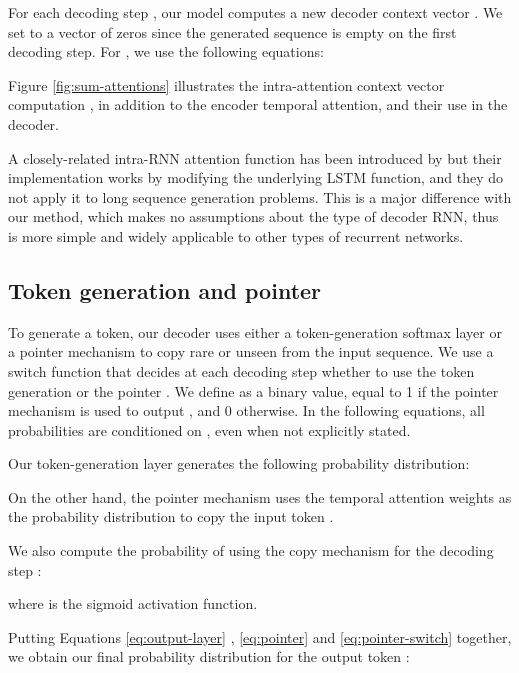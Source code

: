 \documentclass{article} \usepackage{iclr2018_arxiv,times}
\begin{document}
For each decoding step , our model computes a new decoder context vector . We set  to a vector of zeros since the generated sequence is empty on the first decoding step. For , we use the following equations:
\vspace{-5mm}
\begin{multicols}{3}
\end{multicols}

Figure \ref{fig:sum-attentions} illustrates the intra-attention context vector computation , in addition to the encoder temporal attention, and their use in the decoder.

A closely-related intra-RNN attention function has been introduced by \citet{cheng2016} but their implementation works by modifying the underlying LSTM function, and they do not apply it to long sequence generation problems. This is a major difference with our method, which makes no assumptions about the type of decoder RNN, thus is more simple and widely applicable to other types of recurrent networks.

\subsection{Token generation and pointer}
\label{ssec:output-layer}

To generate a token, our decoder uses either a token-generation softmax layer or a pointer mechanism to copy rare or unseen from the input sequence. We use a switch function that decides at each decoding step whether to use the token generation or the pointer \citep{gulcehre2016,nallapati2016}. We define  as a binary value, equal to 1 if the pointer mechanism is used to output , and 0 otherwise. In the following equations, all probabilities are conditioned on , even when not explicitly stated.


Our token-generation layer generates the following probability distribution:


On the other hand, the pointer mechanism uses the temporal attention weights  as the probability distribution to copy the input token .


We also compute the probability of using the copy mechanism for the decoding step :


where  is the sigmoid activation function.

Putting Equations \ref{eq:output-layer} , \ref{eq:pointer} and \ref{eq:pointer-switch} together, we obtain our final probability distribution for the output token :
\end{document}
